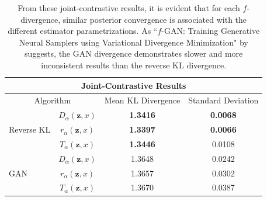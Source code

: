 \documentclass[honours,12pt, twoside]{unswthesis}
\numberwithin{equation}{section}
\theoremstyle{definition}
\begin{document}
\begin{table}[h!]
\centering
\begin{tabular}{|l|c|c|c|}
\hline
\multicolumn{4}{|c|}{Joint-Contrastive Results}\\
\hline
\multicolumn{2}{|c|}{Algorithm} & Mean KL Divergence & Standard Deviation\\
\hline
\multirow{3}{*}{Reverse KL} & $D_\alpha(\bm{z},x)$ & \textbf{1.3416} & \textbf{0.0068}\\
\cline{2-4}
& $r_\alpha(\bm{z},x)$ & \textbf{1.3397} & \textbf{0.0066}\\
\cline{2-4}
& $T_\alpha(\bm{z},x)$ & \textbf{1.3446} & 0.0108\\
\hline
\multirow{3}{*}{GAN} & $D_\alpha(\bm{z},x)$ & 1.3648 & 0.0242\\
\cline{2-4}
& $r_\alpha(\bm{z},x)$ & 1.3657 & 0.0302\\
\cline{2-4}
& $T_\alpha(\bm{z},x)$ & 1.3670 & 0.0387\\
\hline
\end{tabular}
\caption{\small From these joint-contrastive results, it is evident that for each $f$-divergence, similar posterior convergence is associated with the different estimator parametrizations. As ``$f$-GAN: Training Generative Neural Samplers using Variational Divergence Minimization" by \citet{nowozin} suggests, the GAN divergence demonstrates slower and more inconsistent results than the reverse KL divergence.}
\label{tab:6.2}
\end{table}
\end{document}
